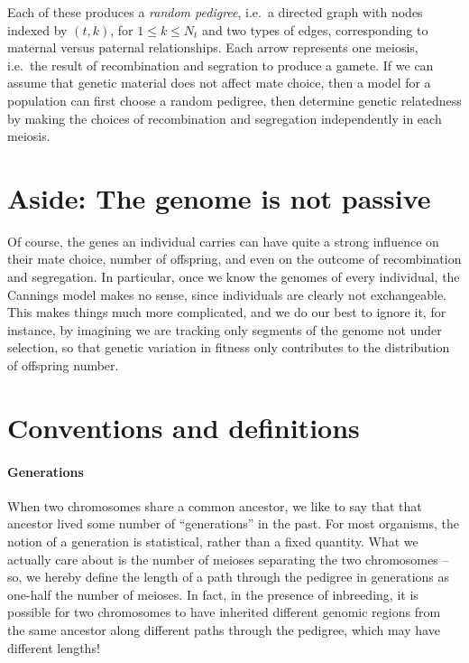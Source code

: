 Each of these produces a \emph{random pedigree}, 
i.e.\ a directed graph with nodes indexed by $(t,k)$, for $1 \le k \le N_t$
and two types of edges, corresponding to maternal versus paternal relationships.
Each arrow represents one meiosis, i.e.\ the result of recombination and segration to produce a gamete.
If we can assume that genetic material does not affect mate choice,
then a model for a population can first choose a random pedigree,
then determine genetic relatedness by making the choices of recombination and segregation
independently in each meiosis.



\section*{Aside: The genome is not passive}

Of course, the genes an individual carries can have quite a strong influence
on their mate choice, number of offspring, and even on the outcome of recombination and segregation.
In particular, once we know the genomes of every individual, the Cannings model makes no sense,
since individuals are clearly not exchangeable.
This makes things much more complicated,
and we do our best to ignore it,
for instance, by imagining we are tracking only segments of the genome not under selection,
so that genetic variation in fitness only contributes to the distribution of offspring number.



\section{Conventions and definitions}

\paragraph{Generations}
  When two chromosomes share a common ancestor, we like to say that that ancestor lived some number of ``generations'' in the past.
  For most organisms, the notion of a generation is statistical, rather than a fixed quantity.
  What we actually care about is the number of meioses separating the two chromosomes --
  so, we hereby define the length of a path through the pedigree in generations as one-half the number of meioses.
  In fact, in the presence of inbreeding, it is possible for two chromosomes to have inherited different genomic regions
  from the same ancestor along different paths through the pedigree, which may have different lengths!

